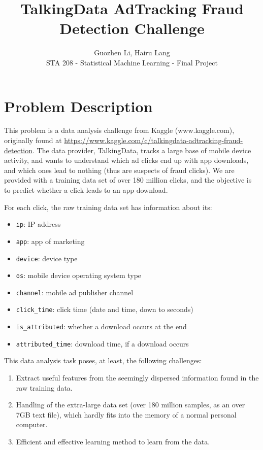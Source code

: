 \documentclass[12pt]{article}
\begin{document}
 
 
 
\title{TalkingData AdTracking Fraud Detection Challenge}%
\author{Guozhen Li, Hairu Lang \\ %
STA 208 - Statistical Machine Learning - Final Project} %

\maketitle


\section{Problem Description}
This problem is a data analysis challenge from Kaggle (www.kaggle.com), originally found at  \url{https://www.kaggle.com/c/talkingdata-adtracking-fraud-detection}.
The data provider, TalkingData, tracks a large base of mobile device activity, 
and wants to understand which ad clicks end up with app downloads, 
and which ones lead to nothing (thus are suspects of fraud clicks).
We are provided with a training data set of over 180 million clicks, 
and the objective is to predict whether a click leads to an app download.

For each click, the raw training data set has information about its:
\begin{itemize}
	\item \texttt{ip}: IP address
	\item \texttt{app}: app of marketing
	\item \texttt{device}: device type
	\item \texttt{os}: mobile device operating system type
	\item \texttt{channel}: mobile ad publisher channel
	\item \texttt{click\_time}: click time (date and time, down to seconds)
	\item \texttt{is\_attributed}: whether a download occurs at the end
	\item \texttt{attributed\_time}: download time, if a download occurs
\end{itemize}

This data analysis task poses, at least, the following challenges:
\begin{enumerate}
	\item Extract useful features from the seemingly dispersed information found in the raw training data.
	\item Handling of the extra-large data set (over 180 million samples, as an over 7GB text file), which hardly fits into the memory of a normal personal computer.
	\item Efficient and effective learning method to learn from the data.
\end{enumerate}
\end{document}
